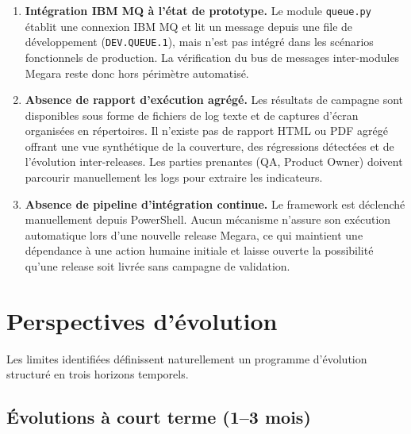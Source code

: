 \documentclass[12pt, a4paper]{report}
\begin{document}
\begin{enumerate}[label=\textbf{L\arabic*.}, leftmargin=*, itemsep=4pt]
  \item \textbf{Intégration IBM MQ à l'état de prototype.}
  Le module \texttt{queue.py} établit une connexion IBM MQ et lit un message depuis une file de développement (\texttt{DEV.QUEUE.1}), mais n'est pas intégré dans les scénarios fonctionnels de production. La vérification du bus de messages inter-modules Megara reste donc hors périmètre automatisé.

  \item \textbf{Absence de rapport d'exécution agrégé.}
  Les résultats de campagne sont disponibles sous forme de fichiers de log texte et de captures d'écran organisées en répertoires. Il n'existe pas de rapport HTML ou PDF agrégé offrant une vue synthétique de la couverture, des régressions détectées et de l'évolution inter-releases. Les parties prenantes (QA, Product Owner) doivent parcourir manuellement les logs pour extraire les indicateurs.

  \item \textbf{Absence de pipeline d'intégration continue.}
  Le framework est déclenché manuellement depuis PowerShell. Aucun mécanisme n'assure son exécution automatique lors d'une nouvelle release Megara, ce qui maintient une dépendance à une action humaine initiale et laisse ouverte la possibilité qu'une release soit livrée sans campagne de validation.

\end{enumerate}

\section*{Perspectives d'évolution}

Les limites identifiées définissent naturellement un programme d'évolution structuré en trois horizons temporels.

\subsection*{Évolutions à court terme (1–3 mois)}
\end{document}
